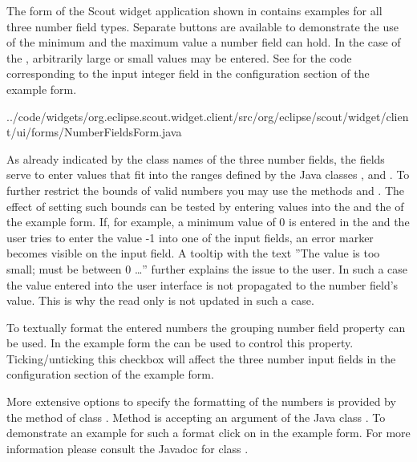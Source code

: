 \documentclass[a4paper,10pt,twoside]{book}
\begin{document}
The form  of the Scout widget application shown in  contains examples for all three number field types.
Separate buttons are available to demonstrate the use of the minimum and the maximum value a number field can hold.
In the case of the , arbitrarily large or small values may be entered. 
See  for the code corresponding to the input integer field in the configuration section of the example form.


{../code/widgets/org.eclipse.scout.widget.client/src/org/eclipse/scout/widget/client/ui/forms/NumberFieldsForm.java}

As already indicated by the class names of the three number fields, the fields serve to enter values that fit into the ranges defined by the Java classes ,  and .
To further restrict the bounds of valid numbers you may use the methods  and .
The effect of setting such bounds can be tested by entering values into the  and the  of the example form.
If, for example, a minimum value of 0 is entered in the  and the user tries to enter the value -1 into one of the input fields, an error marker becomes visible on the input field. 
A tooltip with the text ''The value is too small; must be between 0 \dots'' further explains the issue to the user.
In such a case the value entered into the user interface is not propagated to the number field's value.
This is why the read only  is not updated in such a case.

To textually format the entered numbers the grouping number field property can be used. 
In the example form the  can be used to control this property.
Ticking/unticking this checkbox will affect the three number input fields in the configuration section of the example form.

More extensive options to specify the formatting of the numbers is provided by the method  of class . 
Method  is accepting an argument of the Java class . 
To demonstrate an example for such a format click on  in the example form. 
For more information please consult the Javadoc for class .
\end{document}
